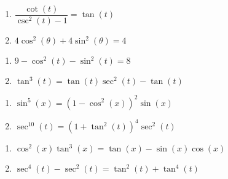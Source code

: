 \begin{multicols}{2}

\begin{enumerate}

\setcounter{enumi}{\value{HW}}

\item   $\dfrac{\cot(t)}{\csc^{2}(t) - 1} = \tan(t)$
\item $4 \cos^{2}(\theta) + 4 \sin^{2}(\theta) = 4$

\setcounter{HW}{\value{enumi}}

\end{enumerate}

\end{multicols}

\begin{multicols}{2}

\begin{enumerate}

\setcounter{enumi}{\value{HW}}

\item $9 - \cos^{2}(t) - \sin^{2}(t) = 8$
\item $\tan^{3}(t) = \tan(t)\sec^{2}(t) - \tan(t)$

\setcounter{HW}{\value{enumi}}

\end{enumerate}

\end{multicols}

\begin{multicols}{2}

\begin{enumerate}

\setcounter{enumi}{\value{HW}}

\item $\sin^{5}(x) = \left(1-\cos^{2}(x)\right)^{2} \sin(x)$
\item $\sec^{10}(t) = \left(1 + \tan^{2}(t)\right)^4 \sec^{2}(t)$

\setcounter{HW}{\value{enumi}}

\end{enumerate}

\end{multicols}

\begin{multicols}{2}

\begin{enumerate}

\setcounter{enumi}{\value{HW}}

\item $\cos^{2}(x)\tan^{3}(x) = \tan(x) - \sin(x)\cos(x)$
\item $\sec^{4}(t) - \sec^{2}(t) = \tan^{2}(t) + \tan^{4}(t)$

\setcounter{HW}{\value{enumi}}

\end{enumerate}

\end{multicols}

